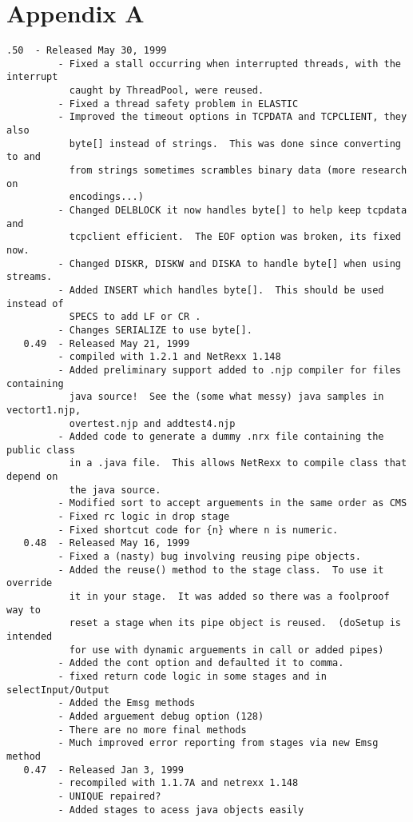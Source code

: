 \chapter{Appendix A}
\begin{verbatim}
.50  - Released May 30, 1999
         - Fixed a stall occurring when interrupted threads, with the interrupt
           caught by ThreadPool, were reused.
         - Fixed a thread safety problem in ELASTIC
         - Improved the timeout options in TCPDATA and TCPCLIENT, they also
           byte[] instead of strings.  This was done since converting to and
           from strings sometimes scrambles binary data (more research on
           encodings...)
         - Changed DELBLOCK it now handles byte[] to help keep tcpdata and
           tcpclient efficient.  The EOF option was broken, its fixed now.
         - Changed DISKR, DISKW and DISKA to handle byte[] when using streams.
         - Added INSERT which handles byte[].  This should be used instead of
           SPECS to add LF or CR .
         - Changes SERIALIZE to use byte[].
   0.49  - Released May 21, 1999
         - compiled with 1.2.1 and NetRexx 1.148
         - Added preliminary support added to .njp compiler for files containing
           java source!  See the (some what messy) java samples in vectort1.njp,
           overtest.njp and addtest4.njp
         - Added code to generate a dummy .nrx file containing the public class
           in a .java file.  This allows NetRexx to compile class that depend on
           the java source.
         - Modified sort to accept arguements in the same order as CMS
         - Fixed rc logic in drop stage
         - Fixed shortcut code for {n} where n is numeric.
   0.48  - Released May 16, 1999
         - Fixed a (nasty) bug involving reusing pipe objects.
         - Added the reuse() method to the stage class.  To use it override
           it in your stage.  It was added so there was a foolproof way to
           reset a stage when its pipe object is reused.  (doSetup is intended
           for use with dynamic arguements in call or added pipes)
         - Added the cont option and defaulted it to comma.
         - fixed return code logic in some stages and in selectInput/Output
         - Added the Emsg methods
         - Added arguement debug option (128)
         - There are no more final methods
         - Much improved error reporting from stages via new Emsg method
   0.47  - Released Jan 3, 1999
         - recompiled with 1.1.7A and netrexx 1.148
         - UNIQUE repaired?
         - Added stages to acess java objects easily

\end{verbatim}
